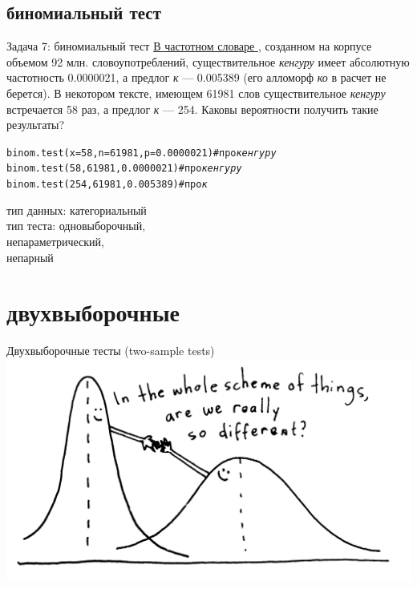\subsection{биномиальный тест}
\begin{frame}{Задача 7: биномиальный тест}
\href{http://dict.ruslang.ru/freq.php}{В \alert{частотном словаре \citep{lyashevskaya09}}}, созданном на корпусе объемом 92 млн. словоупотреблений, существительное \textit{кенгуру} имеет абсолютную частотность 0.0000021, а предлог \textit{к} — 0.005389 (его алломорф \textit{ко} в расчет не берется). В некотором тексте, имеющем 61981 слов существительное \textit{кенгуру} встречается 58 раз, а предлог \textit{к} — 254. Каковы вероятности получить такие результаты?\\ \pause
\vfill
\footnotesize
\begin{alltt}
binom.test(x = 58, n = 61981, p = 0.0000021) \hfill \# про \textit{кенгуру} \\
binom.test(58, 61981, 0.0000021) \hfill \# про \textit{кенгуру}\\ 
binom.test(254, 61981, 0.005389) \hfill \# про \textit{к}
\end{alltt}
\normalsize
\vfill
тип данных: категориальный\\
тип теста: одновыборочный,\\
непараметрический,\\
непарный
\end{frame}
\section{двухвыборочные}
\begin{frame}{Двухвыборочные тесты (two-sample tests)}
\vfill
\includegraphics[width=\linewidth]{twosample.jpg}
\end{frame}
